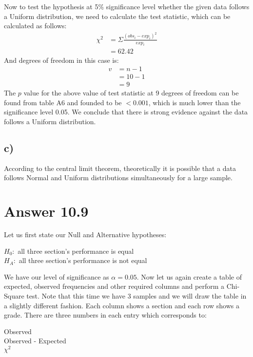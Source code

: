\documentclass[12pt]{article}
\begin{document}
Now to test the hypothesis at 5\% significance level whether the given data follows a Uniform distribution, we need to calculate the test statistic, which can be calculated as follows:
\begin{align*}
\chi^2 &= \Sigma\frac{(obs_i - exp_i)^2}{exp_i} \\
	   &= 62.42
\end{align*}
And degrees of freedom in this case is:
\begin{align*}
v &= n-1 \\
  &= 10-1 \\
  &= 9
\end{align*}
The $p$ value for the above value of test statistic at 9 degrees of freedom can be found from table A6 and founded to be $<0.001$, which is much lower than the significance level 0.05. We conclude that there is strong evidence against the data follows a Uniform distribution.

\subsection*{c)}
According to the central limit theorem, theoretically it is possible that a data follows Normal and Uniform distributions simultaneously for a large sample.

\section*{Answer 10.9}
Let us first state our Null and Alternative hypotheses:

\begin{center}
$H_0:$ all three section's performance is equal \\
$H_A:$ all three section's performance is not equal \\
\end{center}
We have our level of significance as $\alpha = 0.05$. Now let us again create a table of expected, observed frequencies and other required columns and perform a Chi-Square test. Note that this time we have 3 samples and we will draw the table in a slightly different fashion. Each column shows a section and each row shows a grade. There are three numbers in each entry which corresponds to:
\begin{center}
Observed \\
Observed - Expected \\
$\chi^2$
\end{center}
\end{document}
